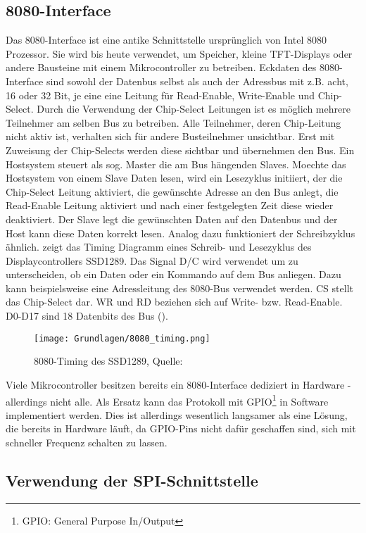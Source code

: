 \subsection{8080-Interface}
Das 8080-Interface ist eine antike Schnittstelle ursprünglich von Intel 8080 Prozessor. Sie wird bis heute verwendet, um Speicher, kleine TFT-Displays oder andere Bausteine mit einem Mikrocontroller zu betreiben. Eckdaten des 8080-Interface sind sowohl der Datenbus selbst als auch der Adressbus mit z.B. acht, 16 oder 32 Bit, je eine eine Leitung für Read-Enable, Write-Enable und Chip-Select. Durch die Verwendung der Chip-Select Leitungen ist es möglich mehrere Teilnehmer am selben Bus zu betreiben. Alle Teilnehmer, deren Chip-Leitung nicht aktiv ist, verhalten sich für andere Busteilnehmer unsichtbar. Erst mit Zuweisung der Chip-Selects werden diese sichtbar und übernehmen den Bus. Ein Hostsystem steuert als sog. Master die am Bus hängenden Slaves. Moechte das Hostsystem von einem Slave Daten lesen, wird ein Lesezyklus initiiert, der die Chip-Select Leitung aktiviert, die gewünschte Adresse an den Bus anlegt, die Read-Enable Leitung aktiviert und nach einer festgelegten Zeit diese wieder deaktiviert. Der Slave legt die gewünschten Daten auf den Datenbus und der Host kann diese Daten korrekt lesen. Analog dazu funktioniert der Schreibzyklus ähnlich. 
 zeigt das Timing Diagramm eines Schreib- und Lesezyklus des Displaycontrollers SSD1289. Das Signal D/C wird verwendet um zu unterscheiden, ob ein Daten oder ein Kommando auf dem Bus anliegen. Dazu kann beispielsweise eine Adressleitung des 8080-Bus verwendet werden. CS stellt das Chip-Select dar. WR und RD beziehen sich auf Write- bzw. Read-Enable. D0-D17 sind 18 Datenbits des Bus (\cite{SSD2007}). 
\begin{figure}[htp]
	\centering
	\texttt{[image: Grundlagen/8080\_timing.png]}
	\caption{8080-Timing des SSD1289, Quelle: \cite{SSD2007}}
	\label{fig:8080_timing}
\end{figure}


Viele Mikrocontroller besitzen bereits ein 8080-Interface dediziert in Hardware - allerdings nicht alle. Als Ersatz kann das Protokoll mit GPIO\footnote{GPIO: General Purpose In/Output} in Software implementiert werden. Dies ist allerdings wesentlich langsamer als eine Lösung, die bereits in Hardware läuft, da GPIO-Pins nicht dafür geschaffen sind, sich mit schneller Frequenz schalten zu lassen.
\clearpage
\subsection{Verwendung der SPI-Schnittstelle}


